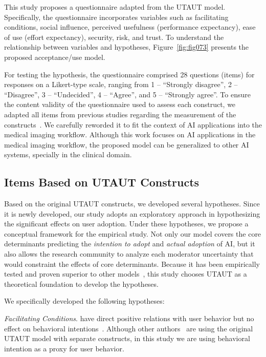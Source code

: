 This study proposes a questionnaire adapted from the UTAUT model.
Specifically, the questionnaire incorporates variables such as facilitating conditions, social influence, perceived usefulness (performance expectancy), ease of use (effort expectancy), security, risk, and trust.
To understand the relationship between variables and hypotheses, Figure~\ref{fig:fig073} presents the proposed acceptance/use model.

For testing the hypothesis, the questionnaire comprised 28 questions (items) for responses on a Likert-type scale, ranging from 1 -- ``Strongly disagree'', 2 -- ``Disagree'', 3 -- ``Undecided'', 4 -- ``Agree'', and 5 -- ``Strongly agree''.
To ensure the content validity of the questionnaire used to assess each construct, we adapted all items from previous studies regarding the measurement of the constructs~\cite{BOOTSMAN201999, LOOIJE2010386}.
We carefully reworded it to fit the context of AI applications into the medical imaging workflow.
Although this work focuses on AI applications in the medical imaging workflow, the proposed model can be generalized to other AI systems, specially in the clinical domain.

\subsection{Items Based on UTAUT Constructs}
\label{sec:chap004003001}

Based on the original UTAUT constructs, we developed several hypotheses.
Since it is newly developed, our study adopts an exploratory approach in hypothesizing the significant effects on user adoption.
Under these hypotheses, we propose a conceptual framework for the empirical study.
Not only our model covers the core determinants predicting the {\it intention to adopt} and {\it actual adoption} of AI, but it also allows the research community to analyze each moderator uncertainty that would constraint the effects of core determinants.
Because it has been empirically tested and proven superior to other models~\cite{AJZEN1991179, RePEc:inm:ormnsc:v:35:y:1989:i:8:p:982-1003}, this study chooses UTAUT as a theoretical foundation to develop the hypotheses.

\vspace{2.25mm}

\noindent
We specifically developed the following hypotheses:

\vspace{2.25mm}

{\it Facilitating Conditions}. have direct positive relations with user behavior but no effect on behavioral intentions~\cite{10.2307/30036540}.
Although other authors~\cite{KHALILZADEH2017460} are using the original UTAUT model with separate constructs, in this study we are using behavioral intention as a proxy for user behavior.

